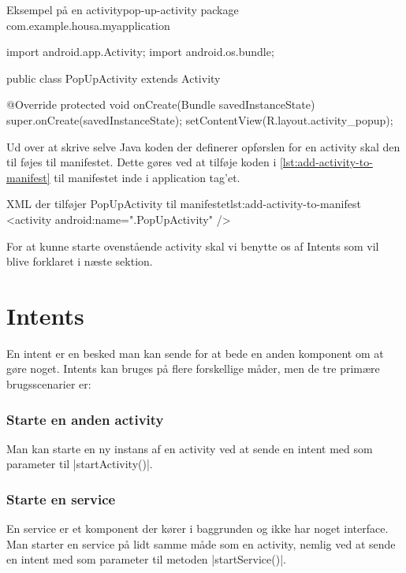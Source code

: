 \begin{JavaCode}{Eksempel på en activity}{pop-up-activity}
	package com.example.housa.myapplication
	
	import android.app.Activity;
	import android.os.bundle;
	
	public class PopUpActivity extends Activity {
 
 @Override
 protected void onCreate(Bundle savedInstanceState) {
  super.onCreate(savedInstanceState);
  setContentView(R.layout.activity_popup);
 }
	}
\end{JavaCode}

Ud over at skrive selve Java koden der definerer opførslen for en activity skal den til føjes til manifestet. Dette gøres ved at tilføje koden i \autoref{lst:add-activity-to-manifest} til manifestet inde i application tag'et.

\begin{XmlCode}{XML der tilføjer PopUpActivity til manifestet}{lst:add-activity-to-manifest}
	<activity android:name=".PopUpActivity" />
\end{XmlCode}

For at kunne starte ovenstående activity skal vi benytte os af Intents som vil blive forklaret i næste sektion.


\section{Intents}

En intent er en besked man kan sende for at bede en anden komponent om at gøre noget. Intents kan bruges på flere forskellige måder, men de tre primære brugsscenarier er:

\subsubsection{Starte en anden activity}

Man kan starte en ny instans af en activity ved at sende en intent med som parameter til \JavaInline|startActivity()|. 

\subsubsection{Starte en service}

En service er et komponent der kører i baggrunden og ikke har noget interface. Man starter en service på lidt samme måde som en activity, nemlig ved at sende en intent med som parameter til metoden \JavaInline|startService()|.

